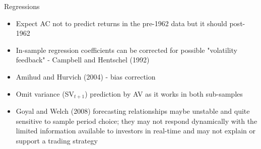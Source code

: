 \documentclass[handout]{beamer}
\begin{document}
\begin{frame}{Regressions}
	\begin{itemize}[<+->]
		\item Expect AC not to predict returns in the pre-1962 data but it should post-1962
		\item In-sample regression coefficients can be corrected for possible "volatility feedback" -  Campbell and
		Hentschel (1992)
		\item Amihud and Hurvich (2004) - bias correction
		\item Omit variance (SV$_{t+1}$) prediction by AV as it works in both sub-samples
		\item Goyal and Welch (2008) forecasting relationships maybe unstable and quite sensitive to sample period choice; they may not respond dynamically with the limited information available to investors in real-time and may not explain or support a trading strategy
	\end{itemize}
\end{frame}

%			

%			
%		
\end{document}
